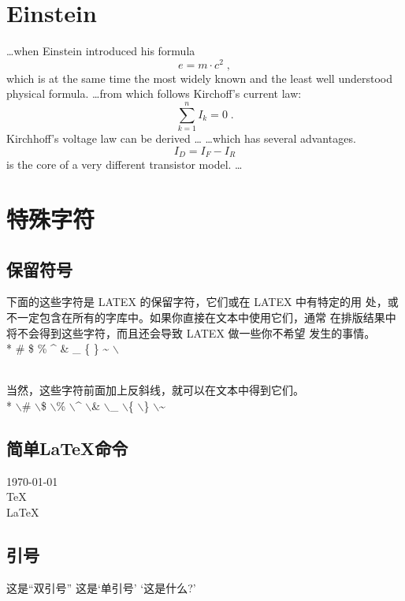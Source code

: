 \documentclass{ctexart}
\begin{document}
\section{Einstein}
\ldots when Einstein introduced his formula
\begin{equation}
  e = m \cdot c^2 \; ,
\end{equation}
which is at the same time the most widely known
and the least well understood physical formula.
\ldots from which follows Kirchoff’s current law:
\begin{equation}
  \sum_{k=1}^{n} I_k = 0 \; .
\end{equation}
Kirchhoff’s voltage law can be derived \ldots
\ldots which has several advantages.
\begin{equation}
  I_D = I_F - I_R
\end{equation}
is the core of a very different transistor model. \ldots

\section{特殊字符}
\subsection{保留符号}
下面的这些字符是 LATEX 的保留字符，它们或在 LATEX 中有特定的用
处，或不一定包含在所有的字库中。如果你直接在文本中使用它们，通常
在排版结果中将不会得到这些字符，而且还会导致 LATEX 做一些你不希望
发生的事情。 \\*
\# \qquad
\$ \qquad
\% \qquad
\^ \qquad
\& \qquad
\_ \qquad
\{ \qquad
\} \qquad
\~ \qquad
$\backslash$ 

\\
当然，这些字符前面加上反斜线，就可以在文本中得到它们。 \\*
$\backslash$\# \qquad
$\backslash$\$ \qquad
$\backslash$\% \qquad
$\backslash$\^ \qquad
$\backslash$\& \qquad
$\backslash$\_ \qquad
$\backslash$\{ \qquad
$\backslash$\} \qquad
$\backslash$\~

\subsection{简单\LaTeX{}命令}
\today \\
\TeX \\
\LaTeX \\
\LaTeXe 

\subsection{引号}
这是``双引号'' \qquad
这是`单引号' \qquad
`这是什么?'
\end{document}
